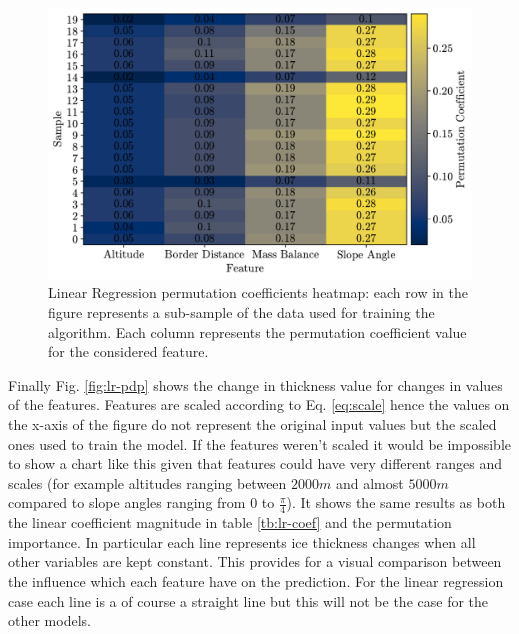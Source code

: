 \begin{figure}[!tp]
	\centering		  
	\includegraphics[width=1.\textwidth]{figures/LR_heatmap.pdf}
	\caption{Linear Regression permutation coefficients heatmap: each row in the figure represents a sub-sample of the data used for training the algorithm. Each column represents the permutation coefficient value for the considered feature.}
	\label{fig:lr-heatmap}
\end{figure}

Finally Fig. \ref{fig:lr-pdp} shows the change in thickness value for changes in values of the features. Features are scaled according to Eq. \ref{eq:scale} hence the values on the x-axis of the figure do not represent the original input values but the scaled ones used to train the model. If the features weren't scaled it would be impossible to show a chart like this given that features could have very different ranges and scales (for example altitudes ranging between  $2000m$ and almost $5000m$ compared to slope angles ranging from $0$ to $\frac{\pi}{4}$). It shows the same results as both the linear coefficient magnitude in table \ref{tb:lr-coef} and the permutation importance. In particular each line represents ice thickness changes when all other variables are kept constant. This provides for a visual comparison between the influence which each feature have on the prediction. For the linear regression case each line is a of course a straight line but this will not be the case for the other models.

